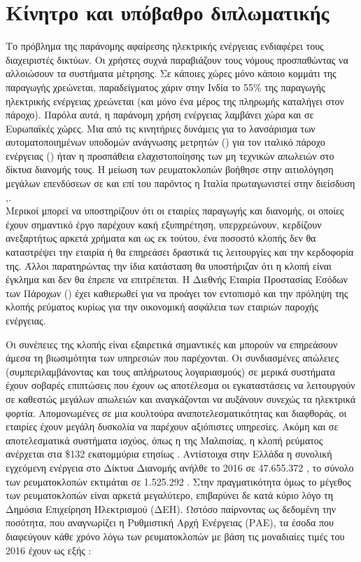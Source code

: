 \section{Κίνητρο και υπόβαθρο διπλωματικής}
Το πρόβλημα της παράνομης αφαίρεσης ηλεκτρικής ενέργειας ενδιαφέρει τους διαχειριστές δικτύων. Οι χρήστες συχνά παραβιάζουν τους νόμους προσπαθώντας να αλλοιώσουν τα συστήματα μέτρησης. Σε κάποιες χώρες μόνο κάποιο κομμάτι της παραγωγής χρεώνεται, παραδείγματος χάριν στην Ινδία το 55\% της παραγωγής ηλεκτρικής ενέργειας χρεώνεται (και μόνο ένα μέρος της πληρωμής καταλήγει στον πάροχο). Παρόλα αυτά, η παράνομη χρήση ενέργειας λαμβάνει χώρα και σε Ευρωπαϊκές χώρες. Μια από τις κινητήριες δυνάμεις για το λανσάρισμα των αυτοματοποιημένων υποδομών ανάγνωσης μετρητών () για τον ιταλικό πάροχο ενέργειας () ήταν η προσπάθεια ελαχιστοποίησης των μη τεχνικών απωλειών στο δίκτυα διανομής τους. Η μείωση των ρευματοκλοπών βοήθησε στην αιτιολόγηση μεγάλων επενδύσεων σε  και επί του παρόντος η Ιταλία πρωταγωνιστεί στην διείσδυση  \cite{india},\cite{regulation}.\\ 
Μερικοί μπορεί να υποστηρίζουν ότι οι εταιρίες παραγωγής και διανομής, οι οποίες έχουν σημαντικό έργο παρέχουν κακή εξυπηρέτηση, υπερχρεώνουν, κερδίζουν ανεξαρτήτως αρκετά χρήματα και ως εκ τούτου, ένα ποσοστό κλοπής δεν θα καταστρέψει την εταιρία ή θα επηρεάσει δραστικά τις λειτουργίες και την κερδοφορία της. Άλλοι παρατηρώντας την ίδια κατάσταση θα υποστήριζαν ότι η κλοπή είναι έγκλημα και δεν θα έπρεπε να επιτρέπεται. Η Διεθνής Εταιρία Προστασίας Εσόδων των Πάροχων () έχει καθιερωθεί για να προάγει τον εντοπισμό και την πρόληψη της κλοπής ρεύματος κυρίως για την οικονομική ασφάλεια των εταιριών παροχής ενέργειας.\par
Οι συνέπειες της κλοπής είναι εξαιρετικά σημαντικές και μπορούν να επηρεάσουν άμεσα τη βιωσιμότητα των υπηρεσιών που παρέχονται. Οι συνδιασμένες απώλειες (συμπεριλαμβάνοντας και τους απλήρωτους λογαριασμούς) σε μερικά συστήματα έχουν σοβαρές επιπτώσεις που έχουν ως αποτέλεσμα οι εγκαταστάσεις να λειτουργούν σε καθεστώς μεγάλων απωλειών και αναγκάζονται να αυξάνουν συνεχώς τα ηλεκτρικά φορτία. Απομονωμένες σε μια κουλτούρα αναποτελεσματικότητας και διαφθοράς, οι εταιρίες έχουν μεγάλη δυσκολία να παρέχουν αξιόπιστες υπηρεσίες. Ακόμη και σε αποτελεσματικά συστήματα ισχύος, όπως η  της Μαλαισίας, η κλοπή ρεύματος ανέρχεται στα \$132 εκατομμύρια ετησίως \cite{malaysia}. Αντίστοιχα στην Ελλάδα η συνολική εγχεόμενη ενέργεια στο Δίκτυα Διανομής ανήλθε το 2016 σε 47.655.372 , το σύνολο των ρευματοκλοπών εκτιμάται σε 1.525.292 . Στην πραγματικότητα όμως το μέγεθος των ρευματοκλοπών είναι αρκετά μεγαλύτερο, επιβαρύνει δε κατά κύριο λόγο τη Δημόσια Επιχείρηση Ηλεκτρισμού (ΔΕΗ). Ωστόσο παίρνοντας ως δεδομένη την ποσότητα, που αναγνωρίζει η Ρυθμιστική Αρχή Ενέργειας (ΡΑΕ), τα έσοδα που διαφεύγουν κάθε χρόνο λόγω των ρευματοκλοπών με βάση τις μοναδιαίες τιμές του 2016 έχουν ως εξής \cite{dehfraud}:

